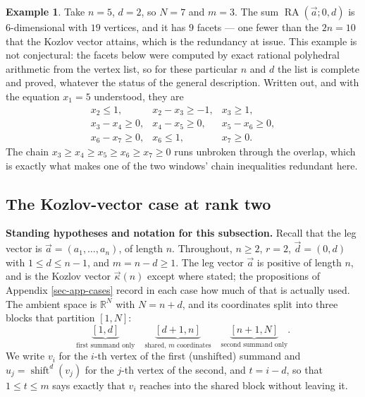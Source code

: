 \documentclass[11pt, a4paper, abstract=yes]{scrartcl}
\theoremstyle{definition}
\newtheorem{mexample}[definition]{Example}
\theoremstyle{remark}
\theoremstyle{plain}
\newcommand{\shift}{\operatorname{shift}}
\newcommand{\RA}{\operatorname{RA}}
\newcommand{\kozvec}{\vec\kappa}
\begin{document}
\begin{mexample}
Take \(n=5\), \(d=2\), so \(N=7\) and \(m=3\). The sum \(\RA(\vec a;0,d)\) is \(6\)-dimensional
with \(19\)
vertices, and it has \(9\) facets --- one fewer than the \(2n=10\) that the Kozlov vector attains,
which is the redundancy at issue. This example is not conjectural: the facets below were computed
by exact rational polyhedral arithmetic from the vertex list, so for these particular \(n\) and
\(d\) the list is complete and proved, whatever the status of the general description. Written out,
and with the equation \(x_1=5\) understood, they are
\[
\begin{array}{lll}
 x_2\le 1, & x_2-x_3\ge-1, & x_3\ge 1,\\
 x_3-x_4\ge 0, & x_4-x_5\ge 0, & x_5-x_6\ge 0,\\
 x_6-x_7\ge 0, & x_6\le 1, & x_7\ge 0 .
\end{array}
\]
The chain \(x_3\ge x_4\ge x_5\ge x_6\ge x_7\ge0\) runs unbroken through the overlap, which is
exactly what makes one of the two windows' chain inequalities redundant here.
\label{ex-ones-facets}
\end{mexample}
\subsection{The Kozlov-vector case at rank two}
\label{sec:org0f1fff3}

\textbf{Standing hypotheses and notation for this subsection.} Recall that the leg vector is
\(\vec a=(a_1,\dots,a_n)\), of length \(n\). Throughout, \(n\ge2\), \(r=2\),
\(\vec d=(0,d)\) with \(1\le d\le n-1\), and \(m=n-d\ge1\). The leg vector \(\vec a\) is positive of
length \(n\), and is the Kozlov vector \(\kozvec(n)\) except where stated; the propositions of
Appendix \ref{sec-app-cases} record in each case how much of that is actually used. The
ambient space is \(\mathbb R^N\) with \(N=n+d\), and its coordinates split into three blocks that
partition \([1,N]\):
\begin{equation}\label{eq:ones-facets}
  \underbrace{[1,d]}_{\text{first summand only}}\quad
  \underbrace{[d+1,n]}_{\text{shared, }m\text{ coordinates}}\quad
  \underbrace{[n+1,N]}_{\text{second summand only}} .
\end{equation}
We write \(v_i\) for the \(i\)-th vertex of the first (unshifted) summand and
\(u_j=\shift^d(v_j)\) for the \(j\)-th vertex of the second, and \(t=i-d\), so that
\(1\le t\le m\) says exactly that \(v_i\) reaches into the shared block without leaving it.
\end{document}
